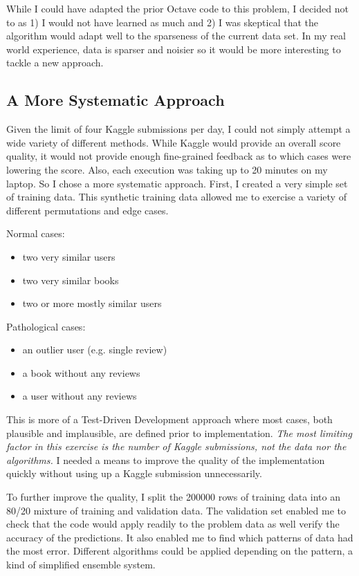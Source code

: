 \documentclass[11pt, oneside]{article}   	%
\begin{document}
While I could have adapted the prior Octave code to this problem, I decided not to as 1) I would not have learned as much and 2) I was skeptical that the algorithm would adapt well to the sparseness of the current data set. In my real world experience, data is sparser and noisier so it would be more interesting to tackle a new approach.

\subsection*{A More Systematic Approach}

Given the limit of four Kaggle submissions per day, I could not simply attempt a wide variety of different methods. While Kaggle would provide an overall score quality, it would not provide enough fine-grained feedback as to which cases were lowering the score. Also, each execution was taking up to 20 minutes on my laptop. So I chose a more systematic approach. First, I created a very simple set of training data. This synthetic training data allowed me to exercise a variety of different permutations and edge cases.

Normal cases:
\begin{itemize}
  \item two very similar users
  \item two very similar books
  \item two or more mostly similar users
\end{itemize}

Pathological cases:
\begin{itemize}
  \item an outlier user (e.g. single review)
  \item a book without any reviews
  \item a user without any reviews
\end{itemize}

This is more of a Test-Driven Development approach where most cases, both plausible and implausible, are defined prior to implementation. \emph{The most limiting factor in this exercise is the number of Kaggle submissions, not the data nor the algorithms.} I needed a means to improve the quality of the implementation quickly without using up a Kaggle submission unnecessarily. 

To further improve the quality, I split the 200000 rows of training data into an 80/20 mixture of training and validation data. The validation set enabled me to check that the code would apply readily to the problem data as well verify the accuracy of the predictions. It also enabled me to find which patterns of data had the most error. Different algorithms could be applied depending on the pattern, a kind of simplified ensemble system.
\end{document}

